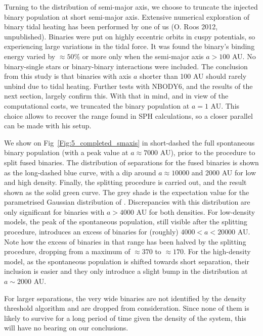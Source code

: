 Turning to the distribution of semi-major axis, we choose to truncate the injected binary population at short semi-major axis. Extensive numerical exploration of binary tidal heating has been performed by one of us (O. Roos 2012, unpublished). Binaries were put on highly eccentric orbits in cuspy \cite{Dehnen1993} potentials, so experiencing large variations in the tidal force. It was found the binary's binding energy varied by $ \approx 50\%$ or more only when the semi-major axis $a >  100$ AU. No binary-single stars or binary-binary interactions were included. The conclusion from this study is that binaries with axis $a$ shorter than 100 AU should rarely unbind due to tidal heating. Further tests with NBODY6, and the results of the next section, largely confirm this. With that in mind, and in view of the computational costs, we truncated the binary population at $a = 1$ AU. This choice allows to recover the range found in \cite{Bbate2012} SPH calculations, so a closer parallel can be made with his setup. 


We show on Fig~\ref{Fig:5_completed_smaxis} in short-dashed  the full spontaneous binary population (with a peak value at $a \approx 7 000$ AU), prior to the procedure to split fused binaries. The distribution of separations for the fused binaries is shown as the long-dashed blue curve, with a dip around $ a \approx 10 000$ and 2000 AU for low and high density. Finally, the splitting procedure is carried out, and the result shown as the solid green curve. The grey shade is the expectation value for
the parametrised Gaussian distribution of \cite{Raghavan2010}. Discrepancies with this distribution are only significant for binaries with $a > 4 000$ AU for both densities. For low-density models, the peak of the spontaneous population, still visible after the splitting procedure, introduces an excess of binaries for (roughly)  $ 4 000 < a < 20 000 $ AU. Note how the excess of binaries in that range has been halved by the splitting procedure, dropping from a maximum of $\approx 370$ to $ \approx 170$. For the high-density model, as the spontaneous population is shifted towards short separation, their inclusion is easier and they only introduce a slight bump in the distribution at $ a \sim 2 000 $ AU.

 For larger separations, the very wide binaries are not identified by the density threshold algorithm and are dropped from consideration. Since none of them is likely to survive for a long period of time given the density of the system, this will have no bearing on our conclusions. 

